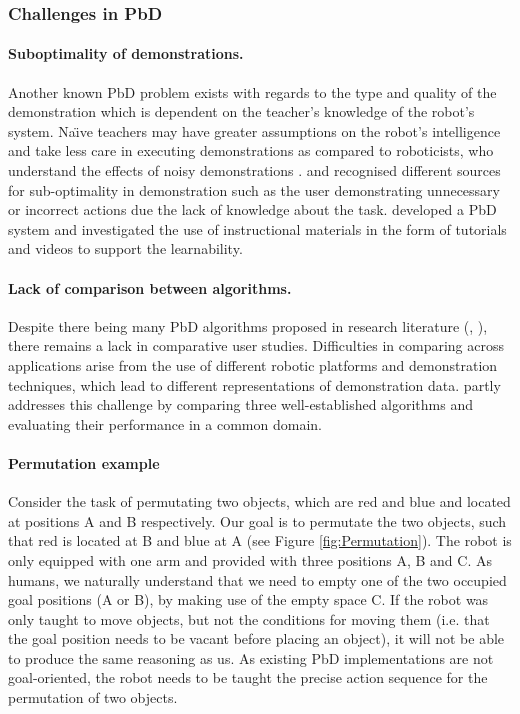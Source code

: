 \subsubsection{Challenges in PbD}\label{sssec:Challenges in PbD}

\paragraph{Suboptimality of demonstrations.}
Another known PbD problem exists with regards to the type and quality of the demonstration which is dependent on the teacher's knowledge of the robot's system.
Na\"{\i}ve teachers may have greater assumptions on the robot's intelligence and take less care in executing demonstrations as compared to roboticists, who understand the effects of noisy demonstrations \cite{suay2012practical}.
\cite{chen2003programing} and \cite{kaiser1995obtaining} recognised different sources for sub-optimality in demonstration such as the user demonstrating unnecessary or incorrect actions due the lack of knowledge about the task.
\cite{cakmak2014teaching} developed a PbD system and investigated the use of instructional materials in the form of tutorials and videos to support the learnability.

\paragraph{Lack of comparison between algorithms.}
Despite there being many PbD algorithms proposed in research literature (\cite{argall2009survey}, \cite{billing2010formalism}), there remains a lack in comparative user studies.
Difficulties in comparing across applications arise from the use of different robotic platforms and demonstration techniques, which lead to different representations of demonstration data.
\cite{suay2012practical} partly addresses this challenge by comparing three well-established algorithms and evaluating their performance in a common domain.


\paragraph{Permutation example}
Consider the task of permutating two objects, which are red and blue and located at positions A and B respectively.
Our goal is to permutate the two objects, such that red is located at B and blue at A (see Figure \ref{fig:Permutation}).
The robot is only equipped with one arm and provided with three positions A, B and C.
As humans, we naturally understand that we need to empty one of the two occupied goal positions (A or B), by making use of the empty space C.
If the robot was only taught to move objects, but not the conditions for moving them (i.e.
 that the goal position needs to be vacant before placing an object), it will not be able to produce the same reasoning as us.
As existing PbD implementations are not goal-oriented, the robot needs to be taught the precise action sequence for the permutation of two objects.

